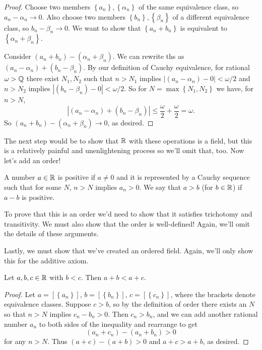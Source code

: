 \documentclass[../m131main.tex]{subfiles}
\begin{document}
\begin{proof}
    Choose two members $\left\{ a_n \right\}, \left\{ \alpha_n \right\}$ of the same equivalence class, so $a_n - \alpha_n \to 0$.
    Also choose two members $\left\{ b_n \right\}, \left\{ \beta_n \right\}$ of a different equivalence class, so $b_n - \beta_n \to 0$.
    We want to show that $\left\{ a_n + b_n \right\}$ is equivalent to $\left\{ \alpha_n + \beta_n \right\}$.

    Consider $(a_n + b_n) - (\alpha_n + \beta_n)$.
    We can rewrite ths as $(a_n - \alpha_n) + (b_n - \beta_n)$.
    By our definition of Cauchy equivalence, for rational $\omega > \mathbb{Q}$ there exist $N_1, N_2$ such that $n > N_1$ implies $|(a_n - \alpha_n) - 0| < \omega / 2$ and $n > N_2$ implies $|(b_n - \beta_n) - 0| < \omega / 2$.
    So for $N = \max \left\{ N_1, N_2 \right\}$ we have, for $n > N$,
    \[ |(a_n - \alpha_n) + (b_n - \beta_n)| \leq \frac{\omega}{2} + \frac{\omega}{2} = \omega. \]
    So $(a_n + b_n) - (\alpha_n + \beta_n) \to 0$, as desired.
\end{proof}

The next step would be to show that $\R$ with these operations is a field, but this is a relatively painful and unenlightening process so we'll omit that, too.
Now let's add an order!

\begin{definition}[Order of $\R$]
    A number $a \in \mathbb{R}$ is positive if $a \neq 0$ and it is represented by a Cauchy sequence such that for some $N$, $n > N$ implies $a_n > 0$.
    We say that $a > b$ (for $b \in \mathbb{R}$) if $a-b$ is positive.
\end{definition}

To prove that this is an order we'd need to show that it satisfies trichotomy and transitivity.
We must also show that the order is well-defined!
Again, we'll omit the details of these arguments.

Lastly, we must show that we've created an ordered field.
Again, we'll only show this for the additive axiom.

\begin{theorem}
    Let $a,b,c \in \mathbb{R}$ with $b < c$.
    Then $a + b < a + c$.
\end{theorem}

\begin{proof}
    Let $a = [\left\{ a_n \right\}]$, $b = [\left\{ b_n \right\}]$, $c = [\left\{ c_n \right\}]$, where the brackets denote equivalence classes.
    Suppose $c > b$, so by the definition of order there exists an $N$ so that $n > N$ implies $c_n - b_n > 0$.
    Then $c_n > b_n$, and we can add another rational number $a_n$ to both sides of the inequality and rearrange to get
    \[ (a_n + c_n) - (a_n + b_n) > 0 \]
    for any $n > N$.
    Thus $(a + c) - (a + b) > 0$ and $a + c > a + b$, as desired.
\end{proof}
\end{document}
